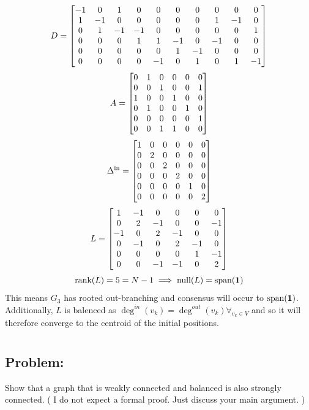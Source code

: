 \documentclass[]{article}
\numberwithin{equation}{section}
\begin{document}
\[
    D = \mqty[
        -1 & 0  & 1  & 0  & 0  & 0  & 0  & 0  & 0  & 0  \\
        1  & -1 & 0  & 0  & 0  & 0  & 0  & 1  & -1 & 0  \\
        0  & 1  & -1 & -1 & 0  & 0  & 0  & 0  & 0  & 1  \\
        0  & 0  & 0  & 1  & 1  & -1 & 0  & -1 & 0  & 0  \\
        0  & 0  & 0  & 0  & 0  & 1  & -1 & 0  & 0  & 0  \\
        0  & 0  & 0  & 0  & -1 & 0  & 1  & 0  & 1  & -1
    ]
\]\[
    A = \mqty[
        0 & 1 & 0 & 0 & 0 & 0 \\
        0 & 0 & 1 & 0 & 0 & 1 \\
        1 & 0 & 0 & 1 & 0 & 0 \\
        0 & 1 & 0 & 0 & 1 & 0 \\
        0 & 0 & 0 & 0 & 0 & 1 \\
        0 & 0 & 1 & 1 & 0 & 0
    ]
\]\[
    \Delta^{\text{in}} = \mqty[
        1 & 0 & 0 & 0 & 0 & 0 \\
        0 & 2 & 0 & 0 & 0 & 0 \\
        0 & 0 & 2 & 0 & 0 & 0 \\
        0 & 0 & 0 & 2 & 0 & 0 \\
        0 & 0 & 0 & 0 & 1 & 0 \\
        0 & 0 & 0 & 0 & 0 & 2
    ]
\]\[
    L = \mqty[
        1  & -1 & 0  & 0  & 0  & 0  \\
        0  & 2  & -1 & 0  & 0  & -1 \\
        -1 & 0  & 2  & -1 & 0  & 0  \\
        0  & -1 & 0  & 2  & -1 & 0  \\
        0  & 0  & 0  & 0  & 1  & -1 \\
        0  & 0  & -1 & -1 & 0  & 2
    ]
\] \[
    \text{rank}(L) = 5 = N-1 \implies \text{null}(L) = \text{span}(\vb{1})
\] This means $G_3$ has rooted out-branching and consensus will occur to $\text{span}(\vb{1})$.
Additionally, $L$ is balenced as $\deg^{in}(v_k) = \deg^{out}(v_k) \forall_{v_k \in V}$
{\color{red} and so it will therefore converge to the centroid of the initial positions.}




\newpage
\section{}
\subsection*{Problem:}
Show that a graph that is weakly connected and balanced is also strongly connected.
(
    I do not expect a formal proof.
    Just discuss your main argument.
)
\end{document}
